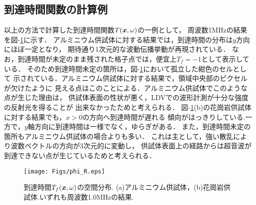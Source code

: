 \subsection{到達時間関数の計算例}
以上の方法で計算した到達時間関数$T(\mbox{\boldmath{$x$}},\omega)$の一例として，
周波数1MHzの結果を図-\ref{fig:fig12}に示す． 
アルミニウム供試体に対する結果では，到達時間の分布は$y$方向にほぼ一定となり，
期待通り1次元的な波動伝播挙動が再現されている．
なお，到達時間が未定のまま残された格子点では，便宜上$T_f=-1$として表示している．
そのため到達時間未定の箇所は，図-\ref{fig:fig12}において孤立した紺色のセルとして
示されている．アルミニウム供試体に対する結果で，領域中央部のピクセルが欠けたように
見える点はこのことによる．アルミニウム供試体でこのような点が生じた理由は，
供試体表面の性状が悪く，LDVでの波形計測が十分な強度の反射光を得ることが
出来なかったためと考えられる．
図-\ref{fig:fig12}(b)の花崗岩供試体に対する結果でも，$x>0$の方向へ到達時間が遅れる
傾向がはっきりしている.一方で，$y$軸方向に到達時間は一様でなく，ゆらぎがある．
また，到達時間未定の箇所もアルミニウム供試体の場合よりも多い．
これは主として，強い散乱により波数ベクトルの方向が3次元的に変動し，
供試体表面上の経路からは超音波が到達できない点が生じているためと考えられる．
\begin{figure}
\begin{center}
	\texttt{[image: Figs/phi\_R.eps]}
	\caption{到達時間$T_f(\mbox{\boldmath{$x$}},\omega)$の空間分布. 
	(a)アルミニウム供試体，(b)花崗岩供試体.いずれも周波数1.0MHzの結果.}
	\label{fig:fig12}
\end{center}
\end{figure}
